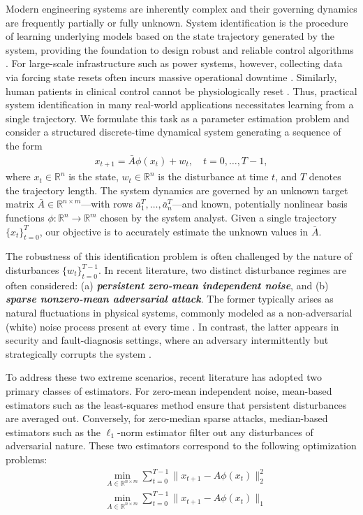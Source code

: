 \documentclass[letterpaper,10pt,conference]{ieeeconf}
\theoremstyle{plain} %
\theoremstyle{plain} %
\theoremstyle{plain} %
\theoremstyle{plain}
\begin{document}
Modern engineering systems are inherently complex and their governing dynamics are frequently partially or fully unknown. System identification is the procedure of learning underlying models based on the state trajectory generated by the system, providing the foundation to design robust and reliable control algorithms \cite{ljung1998sys}. 
For large-scale infrastructure such as power systems, however, collecting data via forcing state resets  often incurs massive operational downtime \cite{ghodeswar2025quantifying}. Similarly, human patients in clinical control  cannot be physiologically reset \cite{allam2021analyzing}. Thus, practical system identification in many real-world applications necessitates learning from a single trajectory. We formulate this task as a parameter estimation problem and consider a structured discrete-time dynamical system generating a sequence of the form
\begin{align}\label{linearlyparam}
    x_{t+1} = \bar A \phi(x_t) +  w_t,\quad t=0,\dots, T-1,
\end{align}
where $x_t\in\mathbb{R}^n$ is the state, $w_t\in\mathbb{R}^n$ is the disturbance at time $t$, and $T$ denotes the trajectory length. The system dynamics are governed by an unknown target matrix
$\bar A \in\mathbb{R}^{n\times m}$—with rows $\bar a_1^T,\dots, \bar a_n^T$—and known, potentially nonlinear basis functions  $\phi:\mathbb{R}^n\to\mathbb{R}^m$ chosen by the system analyst. Given a single trajectory $\{x_t\}_{t=0}^{T}$, our objective is to accurately estimate the unknown values in $\bar A$.

The robustness of this identification problem is often challenged by the nature of disturbances $\{w_t\}_{t=0}^{T-1}$. 
In recent literature, two distinct disturbance regimes are often considered: (a) \textit{\textbf{persistent zero-mean independent noise}}, and (b) \textit{\textbf{sparse nonzero-mean adversarial attack}}. 
The former typically arises as natural fluctuations in physical systems, commonly modeled as a non-adversarial (white) noise process present at every time \cite{freidlin2012random}. In contrast, the latter appears in security and fault-diagnosis settings, where an adversary intermittently but strategically corrupts the system \cite{teixeira2015secure}.

To  address these two extreme scenarios, recent literature has adopted two primary classes of estimators. 
For zero-mean independent noise, mean-based estimators such as the least-squares method ensure that persistent disturbances are averaged out.  Conversely, for zero-median sparse attacks, median-based estimators such as the $\ell_1$-norm estimator filter out any disturbances of adversarial nature. These two estimators correspond to the following optimization problems:
\begin{align}
    &\min_{A\in\mathbb{R}^{n\times m}} \sum_{t=0}^{T-1} \|x_{t+1} - A\phi(x_t)\|_2^2 \tag{Least-squares}\label{ls} \\&\min_{A\in\mathbb{R}^{n\times m}} \sum_{t=0}^{T-1} \|x_{t+1} - A\phi(x_t)\|_1 \tag{$\ell_1$-norm estimator}  \label{l1}
\end{align}
\end{document}
